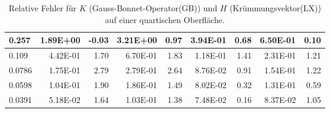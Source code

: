 \begin{table}[htbp]
\begin{tabular}{|l|r|r|r|r|r|r|r|r|}
            0.257 & 1.89E+00 & -0.03 & 3.21E+00 & 0.97 & 3.94E-01 & 0.68 & 6.50E-01 & 0.10 \\ \hline
            0.109 & 4.42E-01 & 1.70 & 6.70E-01 & 1.83 & 1.18E-01 & 1.41 & 2.31E-01 & 1.21 \\ \hline
            0.0786 & 1.75E-01 & 2.79 & 2.79E-01 & 2.64 & 8.76E-02 & 0.91 & 1.54E-01 & 1.22 \\ \hline
            0.0598 & 1.04E-01 & 1.90 & 1.86E-01 & 1.49 & 8.02E-02 & 0.32 & 1.31E-01 & 0.59 \\ \hline
            0.0391 & 5.18E-02 & 1.64 & 1.03E-01 & 1.38 & 7.48E-02 & 0.16 & 8.37E-02 & 1.05 \\ \hline
      \end{tabular}
      \caption[Gauß-Bonnet und Krümmungsvektor auf einer quartischen Oberfläche]{Relative Fehler für \( K \) (Gauss-Bonnet-Operator(GB))
      und \( H \) (Krümmungsvektor(LX)) auf einer quartischen Oberfläche.}
      \label{tabHeineBGBLX}
   \end{table}

